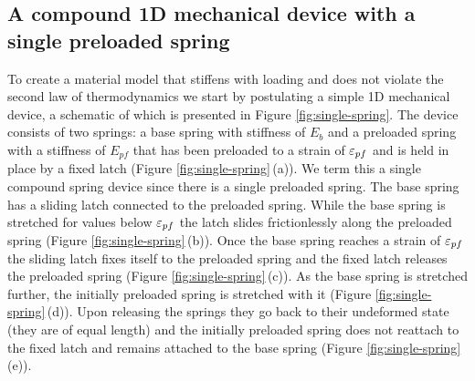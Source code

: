 \documentclass{article}
\begin{document}
\subsection{A compound 1D mechanical device with a single preloaded spring}
To create a material model that stiffens with loading and does not violate the second law of thermodynamics we start by postulating a simple 1D mechanical device, a schematic of which is presented in Figure \ref{fig:single-spring}. 
The device consists of two springs: a base spring with stiffness of $E_b$ and a preloaded spring with a stiffness of $E_{pf}$ that has been preloaded to a strain of $\varepsilon_{pf}$ and is held in place by a fixed latch (Figure \ref{fig:single-spring}\,(a)). We term this a single compound spring device since there is a single preloaded spring. The base spring has a sliding latch connected to the preloaded spring. While the base spring is stretched for values below $\varepsilon_{pf}$ the latch slides frictionlessly along the preloaded spring (Figure \ref{fig:single-spring}\,(b)). Once the base spring reaches a strain of $\varepsilon_{pf}$ the sliding latch fixes itself to the preloaded spring and the fixed latch releases the preloaded spring (Figure \ref{fig:single-spring}\,(c)). As the base spring is stretched further, the initially preloaded spring is stretched with it (Figure \ref{fig:single-spring}\,(d)). Upon releasing the springs they go back to their undeformed state (they are of equal length) and the initially preloaded spring does not reattach to the fixed latch and remains attached to the base spring (Figure \ref{fig:single-spring}\,(e)).
\end{document}
